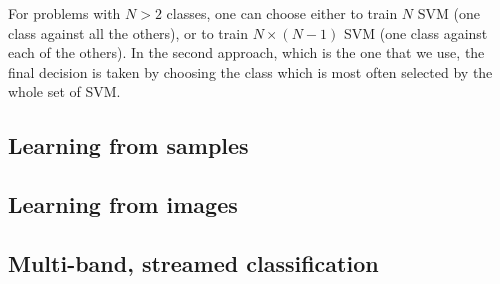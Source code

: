 For problems with $N > 2$ classes, one can choose either to train $N$
SVM (one class against all the others), or to train $N\times(N-1)$ SVM
(one class against each of the others). In the second approach, which
is the one that we use, the final decision is taken by choosing the
class which is most often selected by the whole set of SVM.



\subsection{Learning from samples}
\label{ssec:LearningFromSamples}


\subsection{Learning from images}
\label{ssec:LearningFromImages}



%

%

%

%
%


\subsection{Multi-band, streamed classification}

